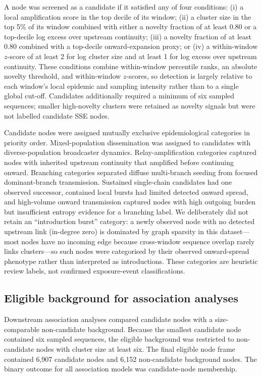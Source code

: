 \documentclass[10pt,letterpaper]{article}
\begin{document}
A node was screened as a candidate if it satisfied any of four conditions: (i) a local amplification score in the top decile of its window; (ii) a cluster size in the top 5\% of its window combined with either a novelty fraction of at least 0.80 or a top-decile log excess over upstream continuity; (iii) a novelty fraction of at least 0.80 combined with a top-decile onward-expansion proxy; or (iv) a within-window $z$-score of at least 2 for log cluster size and at least 1 for log excess over upstream continuity. These conditions combine within-window percentile ranks, an absolute novelty threshold, and within-window $z$-scores, so detection is largely relative to each window's local epidemic and sampling intensity rather than to a single global cut-off. Candidates additionally required a minimum of six sampled sequences; smaller high-novelty clusters were retained as novelty signals but were not labelled candidate SSE nodes.

Candidate nodes were assigned mutually exclusive epidemiological categories in priority order. Mixed-population dissemination was assigned to candidates with diverse-population broadcaster dynamics. Relay-amplification categories captured nodes with inherited upstream continuity that amplified before continuing onward. Branching categories separated diffuse multi-branch seeding from focused dominant-branch transmission. Sustained single-chain candidates had one observed successor, contained local bursts had limited detected onward spread, and high-volume onward transmission captured nodes with high outgoing burden but insufficient entropy evidence for a branching label. We deliberately did not retain an ``introduction burst'' category: a newly observed node with no detected upstream link (in-degree zero) is dominated by graph sparsity in this dataset---most nodes have no incoming edge because cross-window sequence overlap rarely links clusters---so such nodes were categorised by their observed onward-spread phenotype rather than interpreted as introductions. These categories are heuristic review labels, not confirmed exposure-event classifications.

\subsection*{Eligible background for association analyses}

Downstream association analyses compared candidate nodes with a size-comparable non-candidate background. Because the smallest candidate node contained six sampled sequences, the eligible background was restricted to non-candidate nodes with cluster size at least six. The final eligible node frame contained 6,907 candidate nodes and 6,152 non-candidate background nodes. The binary outcome for all association models was candidate-node membership.
\end{document}
